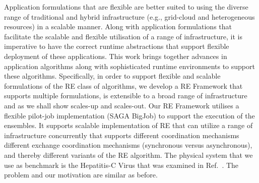 \documentclass{rspublic}
\begin{document}
Application formulations that are flexible are better suited to using
the diverse range of traditional and hybrid infrastructure (e.g.,
grid-cloud and heterogeneous resources) in a scalable manner.  Along
with application formulations that facilitate the scalable and
flexible utilisation of a range of infrastructure, it is imperative to
have the correct runtime abstractions that support flexible deployment
of these applications. This work brings together advances in
application algorithms along with sophisticated runtime environments
to support these algorithms. Specifically, in order to support
flexible and scalable formulations of the RE class of algorithms, we
develop a RE Framework that supports multiple formulations, is
extensible to a broad range of infrastructure and as we shall show
scales-up and scales-out.  Our RE Framework utilises a flexible
pilot-job implementation (SAGA BigJob) to support the execution of the
ensembles.  It supports scalable implementation of RE that can utilize
a range of infrastructure concurrently that supports different
coordination mechanisms different exchange coordination mechanisms
(synchronous versus asynchronous), and thereby different variants of
the RE algorithm. The physical system that we use as benchmark is the
Hepatitis-C Virus that was examined in Ref.~\cite{Luckow:2008fp}. The
problem and our motivation are similar as before.

\end{document}
